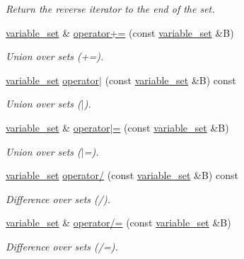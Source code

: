 \begin{DoxyCompactItemize}
\begin{DoxyCompactList}\small\item\em Return the reverse iterator to the end of the set. \end{DoxyCompactList}\item 
\hyperlink{classmerlin_1_1variable__set}{variable\+\_\+set} \& \hyperlink{classmerlin_1_1variable__set_af5b559c7e0f5404841f30698acbfb65b}{operator+=} (const \hyperlink{classmerlin_1_1variable__set}{variable\+\_\+set} \&B)
\begin{DoxyCompactList}\small\item\em Union over sets (+=). \end{DoxyCompactList}\item 
\hyperlink{classmerlin_1_1variable__set}{variable\+\_\+set} \hyperlink{classmerlin_1_1variable__set_a45492dc5a320d12e02e22edbff244f43}{operator$\vert$} (const \hyperlink{classmerlin_1_1variable__set}{variable\+\_\+set} \&B) const 
\begin{DoxyCompactList}\small\item\em Union over sets ($\vert$). \end{DoxyCompactList}\item 
\hyperlink{classmerlin_1_1variable__set}{variable\+\_\+set} \& \hyperlink{classmerlin_1_1variable__set_adf7b50e5531e701e701f860f61c2a7c2}{operator$\vert$=} (const \hyperlink{classmerlin_1_1variable__set}{variable\+\_\+set} \&B)
\begin{DoxyCompactList}\small\item\em Union over sets ($\vert$=). \end{DoxyCompactList}\item 
\hyperlink{classmerlin_1_1variable__set}{variable\+\_\+set} \hyperlink{classmerlin_1_1variable__set_a64dadf81bbad86010f98d1b368f88662}{operator/} (const \hyperlink{classmerlin_1_1variable__set}{variable\+\_\+set} \&B) const 
\begin{DoxyCompactList}\small\item\em Difference over sets (/). \end{DoxyCompactList}\item 
\hyperlink{classmerlin_1_1variable__set}{variable\+\_\+set} \& \hyperlink{classmerlin_1_1variable__set_a10cbe436da4784e47bec9b2343e00b3e}{operator/=} (const \hyperlink{classmerlin_1_1variable__set}{variable\+\_\+set} \&B)
\begin{DoxyCompactList}\small\item\em Difference over sets (/=). \end{DoxyCompactList}\item 

\end{DoxyCompactItemize}
